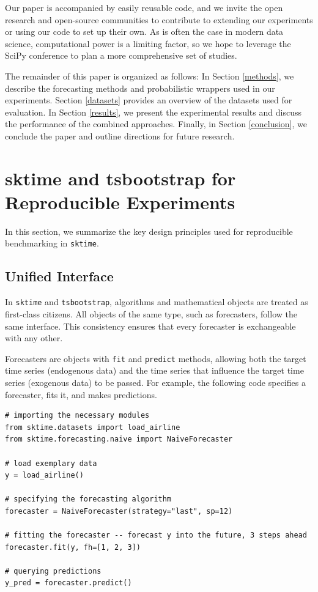 Our paper is accompanied by easily reusable code, and we invite the open research and open-source communities to contribute to extending our experiments or using our code to set up their own. As is often the case in modern data science, computational power is a limiting factor, so we hope to leverage the SciPy conference to plan a more comprehensive set of studies.

The remainder of this paper is organized as follows: In Section \ref{methods}, we describe the forecasting methods and probabilistic wrappers used in our experiments. Section \ref{datasets} provides an overview of the datasets used for evaluation. In Section \ref{results}, we present the experimental results and discuss the performance of the combined approaches. Finally, in Section \ref{conclusion}, we conclude the paper and outline directions for future research.

\section{sktime and tsbootstrap for Reproducible Experiments}\label{sktime}

In this section, we summarize the key design principles used for reproducible benchmarking in \texttt{sktime}.

\subsection{Unified Interface}
In \texttt{sktime} and \texttt{tsbootstrap}, algorithms and mathematical objects are treated as first-class citizens. All objects of the same type, such as forecasters, follow the same interface. This consistency ensures that every forecaster is exchangeable with any other.

Forecasters are objects with \texttt{fit} and \texttt{predict} methods, allowing both the target time series (endogenous data) and the time series that influence the target time series (exogenous data) to be passed. For example, the following code specifies a forecaster, fits it, and makes predictions.

\begin{verbatim}
# importing the necessary modules
from sktime.datasets import load_airline
from sktime.forecasting.naive import NaiveForecaster

# load exemplary data
y = load_airline()

# specifying the forecasting algorithm
forecaster = NaiveForecaster(strategy="last", sp=12)

# fitting the forecaster -- forecast y into the future, 3 steps ahead
forecaster.fit(y, fh=[1, 2, 3])

# querying predictions
y_pred = forecaster.predict()
\end{verbatim}

